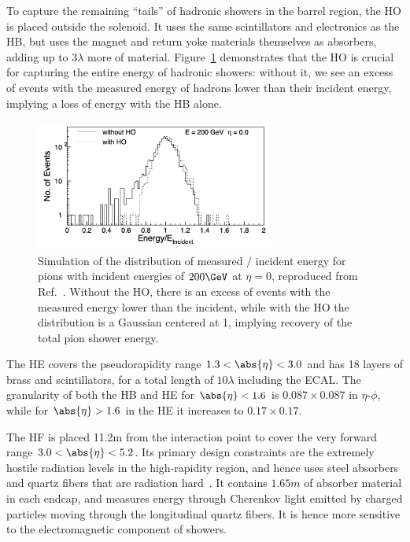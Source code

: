 To capture the remaining ``tails'' of hadronic showers in the barrel region, the HO is placed outside the solenoid.
It uses the same scintillators and electronics as the HB, but uses the magnet and return yoke materials themselves as absorbers, adding up to $3\lambda$ more of material.
Figure~\ref{fig:02_cms_hcal_ho} demonstrates that the HO is crucial for capturing the entire energy of hadronic showers: without it, we see an excess of events with the measured energy of hadrons lower than their incident energy, implying a loss of energy with the HB alone.

\begin{figure}[ht]
    \centering
    \includegraphics[width=0.7\textwidth]{figures/02-CMS/cms/components/hcal_ho_energy.png}
    \caption[Simulation of the distribution of measured $/$ incident energy for pions with incident energies of $200\GeV$ at $\eta = 0$, reproduced from Ref.~\cite{CMS:2008xjf}.]{Simulation of the distribution of measured $/$ incident energy for pions with incident energies of $200\GeV$ at $\eta = 0$, reproduced from Ref.~\cite{CMS:2008xjf}.
    Without the HO, there is an excess of events with the measured energy lower than the incident, while with the HO the distribution is a Gaussian centered at 1, implying recovery of the total pion shower energy.}
    \label{fig:02_cms_hcal_ho}
\end{figure}

The HE covers the pseudorapidity range $1.3 < \abs{\eta} < 3.0$ and has 18 layers of brass and scintillators, for a total length of $10\lambda$ including the ECAL.
The granularity of both the HB and HE for $\abs{\eta} < 1.6$ is $0.087\times0.087$ in $\eta$-$\phi$, while for $\abs{\eta} > 1.6$ in the HE it increases to $0.17\times0.17$.

The HF is placed 11.2\unit{m} from the interaction point to cover the very forward range $3.0 < \abs{\eta} < 5.2$.
Its primary design constraints are the extremely hostile radiation levels in the high-rapidity region, and hence uses steel absorbers and quartz fibers that are radiation hard~\cite{Penzo:2009zz}.
It contains $1.65\unit{m}$ of absorber material in each endcap, and measures energy through Cherenkov light emitted by charged particles moving through the longitudinal quartz fibers.
It is hence more sensitive to the electromagnetic component of showers.

